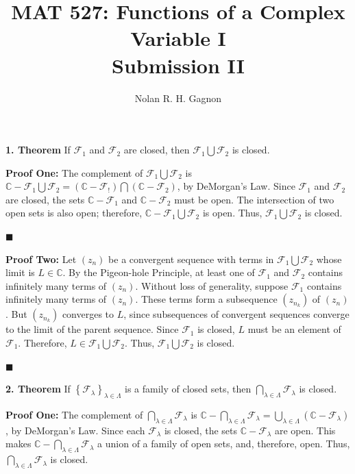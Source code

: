 \documentclass{article}
\title{MAT 527:  Functions of a Complex Variable I \\
	   \textbf{Submission II}}
\author{Nolan R. H. Gagnon}
\newcommand{\mybox}{%
    \collectbox{%
        \setlength{\fboxsep}{1pt}%
        \fbox{\BOXCONTENT}%
    }%
}
\begin{document}
\maketitle
\large
\noindent\mybox{\textbf{1. Theorem}} If $\mathcal{F}_1$ and $\mathcal{F}_2$ are closed, then $\mathcal{F}_1 \bigcup \mathcal{F}_2$ is closed. 

\vspace{3mm}

\noindent\textbf{Proof One:}  The complement of $\mathcal{F}_1 \bigcup \mathcal{F}_2$ is $\mathbb{C} - \mathcal{F}_1 \bigcup \mathcal{F}_2 = \left(\mathbb{C} - \mathcal{F}_!\right) \bigcap \left(\mathbb{C} - \mathcal{F}_2\right)$, by DeMorgan's Law.  Since $\mathcal{F}_1$ and $\mathcal{F}_2$ are closed, the sets $\mathbb{C} -\mathcal{F}_1$ and $\mathbb{C} - \mathcal{F}_2$ must be open.  The intersection of two open sets is also open; therefore, $\mathbb{C} - \mathcal{F}_1 \bigcup \mathcal{F}_2$ is open.  Thus, $\mathcal{F}_1 \bigcup \mathcal{F}_2$ is closed.

\hfill$\blacksquare$

\vspace{3mm}

\noindent\textbf{Proof Two:}  Let $(z_n)$ be a convergent sequence with terms in $\mathcal{F}_1 \bigcup \mathcal{F}_2$ whose limit is $L\in\mathbb{C}$.  By the Pigeon-hole Principle, at least one of $\mathcal{F}_1$ and $\mathcal{F}_2$ contains infinitely many terms of $(z_n)$.  Without loss of generality, suppose $\mathcal{F}_1$ contains infinitely many terms of $(z_n)$.  These terms form a subsequence $(z_{n_k})$ of $(z_n)$.  But $(z_{n_k})$ converges to $L$, since subsequences of convergent sequences converge to the limit of the parent sequence.  Since $\mathcal{F}_1$ is closed, $L$ must be an element of $\mathcal{F}_1$.  Therefore, $L\in \mathcal{F}_1 \bigcup \mathcal{F}_2$.  Thus, $\mathcal{F}_1 \bigcup \mathcal{F}_2$ is closed.

\hfill$\blacksquare$

\vspace{15mm}

\noindent\mybox{\textbf{2. Theorem}} If $\left\lbrace \mathcal{F}_{\lambda}\right\rbrace_{\lambda\in\Lambda}$ is a family of closed sets, then $\bigcap_{\lambda\in\Lambda}\mathcal{F}_{\lambda}$ is closed. 

\vspace{3mm}

\noindent\textbf{Proof One:}  The complement of $\bigcap_{\lambda\in\Lambda}\mathcal{F}_{\lambda}$ is $\mathbb{C} - \bigcap_{\lambda\in\Lambda}\mathcal{F}_{\lambda} = \bigcup_{\lambda\in\Lambda}(\mathbb{C} - \mathcal{F}_{\lambda})$, by DeMorgan's Law.  Since each $\mathcal{F}_{\lambda}$ is closed, the sets $\mathbb{C} - \mathcal{F}_{\lambda}$ are open.  This makes $\mathbb{C} - \bigcap_{\lambda\in\Lambda}\mathcal{F}_{\lambda}$ a union of a family of open sets, and, therefore, open.  Thus, $\bigcap_{\lambda\in\Lambda}\mathcal{F}_{\lambda}$ is closed. 
\end{document}
